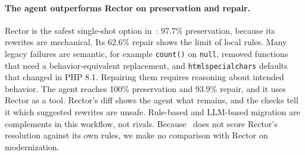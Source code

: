 \documentclass[11pt]{article}
\newcommand{\code}[1]{\texttt{#1}}
\begin{document}
\paragraph{The agent outperforms Rector on preservation and repair.}
Rector is the safest single-shot option in~\cite{mahmud2026modernization}: 97.7\% preservation, because its rewrites are mechanical.
Its 62.6\% repair shows the limit of local rules.
Many legacy failures are semantic, for example \code{count()} on \code{null}, removed functions that need a behavior-equivalent replacement, and \code{htmlspecialchars} defaults that changed in PHP 8.1.
Repairing them requires reasoning about intended behavior.
The agent reaches 100\% preservation and 93.9\% repair, and it uses Rector as a tool.
Rector's diff shows the agent what remains, and the checks tell it which suggested rewrites are unsafe.
Rule-based and LLM-based migration are complements in this workflow, not rivals.
Because~\cite{mahmud2026modernization} does not score Rector's resolution against its own rules, we make no comparison with Rector on modernization.
\end{document}
